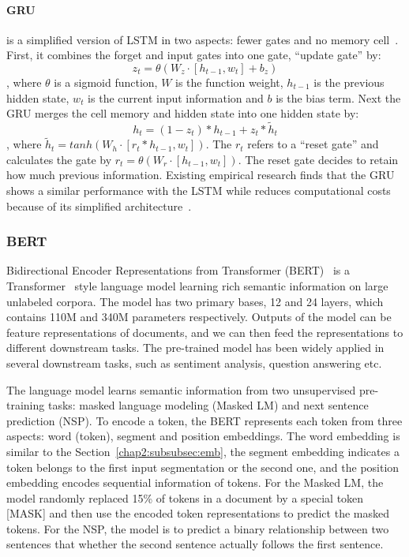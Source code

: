 \paragraph{GRU} is a simplified version of LSTM in two aspects: fewer gates and no memory cell~\cite{chung2014empirical}.
First, it combines the forget and input gates into one gate, ``update gate'' by:
$$z_t = \theta(W_z \cdot [h_{t-1}, w_t] + b_z)$$
, where $\theta$ is a sigmoid function, $W$ is the function weight, $h_{t-1}$ is the previous hidden state, $w_t$ is the current input information and $b$ is the bias term.
Next the GRU merges the cell memory and hidden state into one hidden state by:
$$h_t = (1-z_t) * h_{t-1} + z_t * \tilde{h}_t$$
, where $\tilde{h}_t = tanh(W_h \cdot [r_t * h_{t-1}, w_t])$.
The $r_t$ refers to a ``reset gate'' and calculates the gate by $r_t = \theta(W_r \cdot [h_{t-1}, w_t])$.
The reset gate decides to retain how much previous information.
Existing empirical research finds that the GRU shows a similar performance with the LSTM while reduces computational costs because of its simplified architecture~\cite{chung2014empirical}.


\subsubsection{BERT} 
Bidirectional Encoder Representations from Transformer (BERT)~\cite{devlin2019bert} is a Transformer~\cite{vaswani2017attention} style language model learning rich semantic information on large unlabeled corpora.
The model has two primary bases, 12 and 24 layers, which contains 110M and 340M parameters respectively.
Outputs of the model can be feature representations of documents, and we can then feed the representations to different downstream tasks.
The pre-trained model has been widely applied in several downstream tasks, such as sentiment analysis, question answering etc.

The language model learns semantic information from two unsupervised pre-training tasks: masked language modeling (Masked LM) and next sentence prediction (NSP). 
To encode a token, the BERT represents each token from three aspects: word (token), segment and position embeddings.
The word embedding is similar to the Section~\ref{chap2:subsubsec:emb}, the segment embedding indicates a token belongs to the first input segmentation or the second one, and the position embedding encodes sequential information of tokens.
For the Masked LM, the model randomly replaced 15\% of tokens in a document by a special token [MASK] and then use the encoded token representations to predict the masked tokens.
For the NSP, the model is to predict a binary relationship between two sentences that whether the second sentence actually follows the first sentence.


